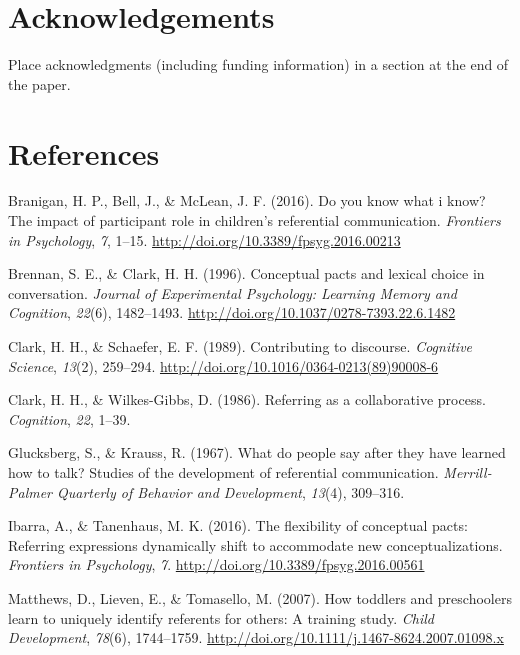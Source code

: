 \documentclass[10pt, letterpaper]{article}
\begin{document}
\hypertarget{acknowledgements}{%
\section{Acknowledgements}\label{acknowledgements}}

Place acknowledgments (including funding information) in a section at
the end of the paper.

\hypertarget{references}{%
\section{References}\label{references}}

\setlength{\parindent}{-0.1in} 
\setlength{\leftskip}{0.125in}

\noindent

\hypertarget{refs}{}
\leavevmode\hypertarget{ref-Branigan2016Do}{}%
Branigan, H. P., Bell, J., \& McLean, J. F. (2016). Do you know what i
know? The impact of participant role in children's referential
communication. \emph{Frontiers in Psychology}, \emph{7}, 1--15.
\url{http://doi.org/10.3389/fpsyg.2016.00213}

\leavevmode\hypertarget{ref-Brennan1996Conceptual}{}%
Brennan, S. E., \& Clark, H. H. (1996). Conceptual pacts and lexical
choice in conversation. \emph{Journal of Experimental Psychology:
Learning Memory and Cognition}, \emph{22}(6), 1482--1493.
\url{http://doi.org/10.1037/0278-7393.22.6.1482}

\leavevmode\hypertarget{ref-Clark1989Contributing}{}%
Clark, H. H., \& Schaefer, E. F. (1989). Contributing to discourse.
\emph{Cognitive Science}, \emph{13}(2), 259--294.
\url{http://doi.org/10.1016/0364-0213(89)90008-6}

\leavevmode\hypertarget{ref-Clark1986Referring}{}%
Clark, H. H., \& Wilkes-Gibbs, D. (1986). Referring as a collaborative
process. \emph{Cognition}, \emph{22}, 1--39.

\leavevmode\hypertarget{ref-Glucksberg1967What}{}%
Glucksberg, S., \& Krauss, R. (1967). What do people say after they have
learned how to talk? Studies of the development of referential
communication. \emph{Merrill-Palmer Quarterly of Behavior and
Development}, \emph{13}(4), 309--316.

\leavevmode\hypertarget{ref-Ibarra2016flexibility}{}%
Ibarra, A., \& Tanenhaus, M. K. (2016). The flexibility of conceptual
pacts: Referring expressions dynamically shift to accommodate new
conceptualizations. \emph{Frontiers in Psychology}, \emph{7}.
\url{http://doi.org/10.3389/fpsyg.2016.00561}

\leavevmode\hypertarget{ref-Matthews2007How}{}%
Matthews, D., Lieven, E., \& Tomasello, M. (2007). How toddlers and
preschoolers learn to uniquely identify referents for others: A training
study. \emph{Child Development}, \emph{78}(6), 1744--1759.
\url{http://doi.org/10.1111/j.1467-8624.2007.01098.x}


\end{document}

